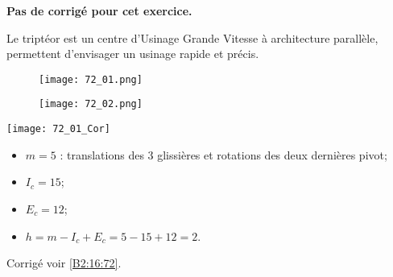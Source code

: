 \normaltrue \difficilefalse \tdifficilefalse
\correctiontrue

\setcounter{numques}{0}


\ifcorrection
\else
\textbf{Pas de corrigé pour cet exercice.}
\fi

\ifprof
\else
Le triptéor est un centre d'Usinage Grande Vitesse à architecture parallèle, permettent d'envisager un usinage rapide et précis.


\begin{figure}[H]
\centering
\texttt{[image: 72\_01.png]}
\end{figure} 

\begin{figure}[H]
\centering
\texttt{[image: 72\_02.png]}
\end{figure} 
\fi

\ifprof
\begin{center}
\texttt{[image: 72\_01\_Cor]}
\end{center}
\else
\fi

\ifprof
\begin{itemize}
\item $m=5$ : translations des 3 glissières et rotations des deux dernières pivot;
\item $I_c=15$;
\item $E_c = 12$;
\item $h=m-I_c+E_c = 5 -15 + 12 = 2$.
\end{itemize}
\else
\fi
 

\ifprof
\else

\noindent\footnotesize
\normalsize

\begin{flushright}
\footnotesize{Corrigé  voir \ref{B2:16:72}.}
\end{flushright}%
\fi
